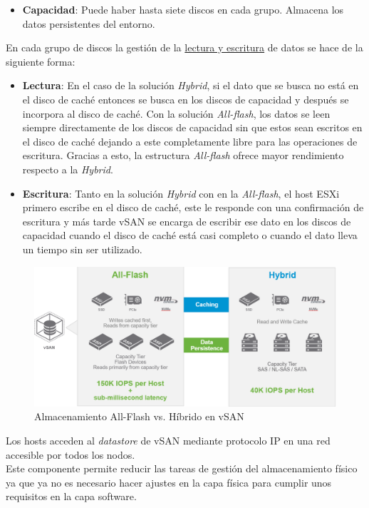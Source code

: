 \begin{itemize}
\begin{itemize}
            \item \textbf{Capacidad}: Puede haber hasta siete discos en cada grupo. Almacena los datos persistentes del entorno.
        \end{itemize}
    En cada grupo de discos la gestión de la \underline{lectura y escritura} de datos se hace de la siguiente forma:
        \begin{itemize}
            \item \textbf{Lectura}: En el caso de la solución \textit{Hybrid}, si el dato que se busca no está en el disco de caché entonces se busca en los discos de capacidad y después se incorpora al disco de caché. Con la solución \textit{All-flash}, los datos se leen siempre directamente de los discos de capacidad sin que estos sean escritos en el disco de caché dejando a este completamente libre para las operaciones de escritura. Gracias a esto, la estructura \textit{All-flash} ofrece mayor rendimiento respecto a la \textit{Hybrid}.
            \item \textbf{Escritura}: Tanto en la solución \textit{Hybrid} con en la \textit{All-flash}, el host ESXi primero escribe en el disco de caché, este le responde con una confirmación de escritura y más tarde vSAN se encarga de escribir ese dato en los discos de capacidad cuando el disco de caché está casi completo o cuando el dato lleva un tiempo sin ser utilizado.
        \end{itemize}
        \begin{figure}[h!]
            \centering
            \includegraphics[width=1\textwidth]{imaxes/cap2recursos/rendimientoVSAN.png}
            \caption{Almacenamiento All-Flash vs. Híbrido en vSAN}
            \label{fig:rendimientoVSAN}
        \end{figure}
        \FloatBarrier
    Los hosts acceden al \textit{datastore} de vSAN mediante protocolo IP en una red accesible por todos los nodos. \\ 
    Este componente permite reducir las tareas de gestión del almacenamiento físico ya que ya no es necesario hacer ajustes en la capa física para cumplir unos requisitos en la capa software.
   

\end{itemize}
